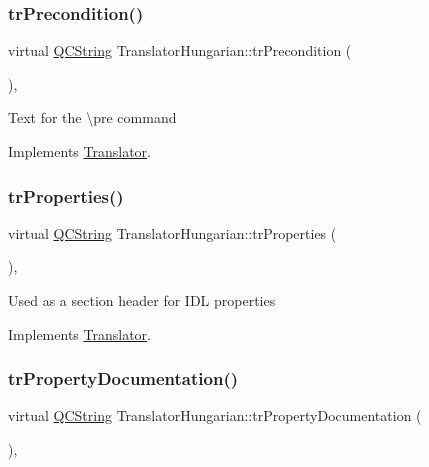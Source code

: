 \subsubsection{\texorpdfstring{trPrecondition()}{trPrecondition()}}
{\footnotesize\ttfamily virtual \mbox{\hyperlink{class_q_c_string}{Q\+C\+String}} Translator\+Hungarian\+::tr\+Precondition (\begin{DoxyParamCaption}{ }\end{DoxyParamCaption})\hspace{0.3cm}{\ttfamily [inline]}, {\ttfamily [virtual]}}

Text for the \textbackslash{}pre command 

Implements \mbox{\hyperlink{class_translator}{Translator}}.

\mbox{\label{class_translator_hungarian_a5bf47e3acecf2f64599c35211235fc2f}} 
\subsubsection{\texorpdfstring{trProperties()}{trProperties()}}
{\footnotesize\ttfamily virtual \mbox{\hyperlink{class_q_c_string}{Q\+C\+String}} Translator\+Hungarian\+::tr\+Properties (\begin{DoxyParamCaption}{ }\end{DoxyParamCaption})\hspace{0.3cm}{\ttfamily [inline]}, {\ttfamily [virtual]}}

Used as a section header for I\+DL properties 

Implements \mbox{\hyperlink{class_translator}{Translator}}.

\mbox{\label{class_translator_hungarian_a688cd2f3172c0ae2e58f7f810b6370be}} 
\subsubsection{\texorpdfstring{trPropertyDocumentation()}{trPropertyDocumentation()}}
{\footnotesize\ttfamily virtual \mbox{\hyperlink{class_q_c_string}{Q\+C\+String}} Translator\+Hungarian\+::tr\+Property\+Documentation (\begin{DoxyParamCaption}{ }\end{DoxyParamCaption})\hspace{0.3cm}{\ttfamily [inline]}, {\ttfamily [virtual]}}

